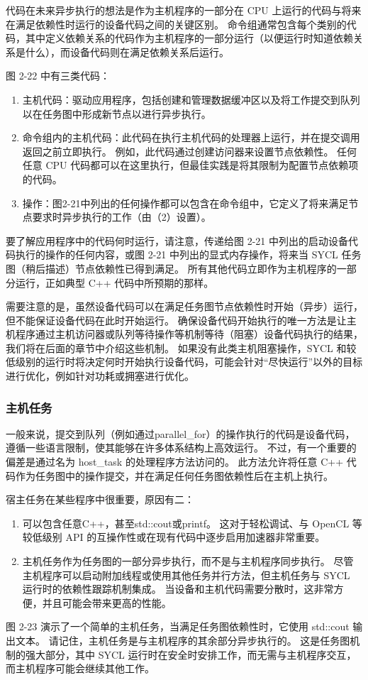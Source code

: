 代码在未来异步执行的想法是作为主机程序的一部分在 CPU 上运行的代码与将来在满足依赖性时运行的设备代码之间的关键区别。 命令组通常包含每个类别的代码，其中定义依赖关系的代码作为主机程序的一部分运行（以便运行时知道依赖关系是什么），而设备代码则在满足依赖关系后运行。

图 2-22 中有三类代码：

\begin{enumerate}
	\item 主机代码：驱动应用程序，包括创建和管理数据缓冲区以及将工作提交到队列以在任务图中形成新节点以进行异步执行。

	\item 命令组内的主机代码：此代码在执行主机代码的处理器上运行，并在提交调用返回之前立即执行。 例如，此代码通过创建访问器来设置节点依赖性。 任何任意 CPU 代码都可以在这里执行，但最佳实践是将其限制为配置节点依赖项的代码。

	\item 操作：图2-21中列出的任何操作都可以包含在命令组中，它定义了将来满足节点要求时异步执行的工作（由（2）设置）。
\end{enumerate}

要了解应用程序中的代码何时运行，请注意，传递给图 2-21 中列出的启动设备代码执行的操作的任何内容，或图 2-21 中列出的显式内存操作，将来当 SYCL 任务图（稍后描述）节点依赖性已得到满足。 所有其他代码立即作为主机程序的一部分运行，正如典型 C++ 代码中所预期的那样。

需要注意的是，虽然设备代码可以在满足任务图节点依赖性时开始（异步）运行，但不能保证设备代码在此时开始运行。 确保设备代码开始执行的唯一方法是让主机程序通过主机访问器或队列等待操作等机制等待（阻塞）设备代码执行的结果，我们将在后面的章节中介绍这些机制。 如果没有此类主机阻塞操作，SYCL 和较低级别的运行时将决定何时开始执行设备代码，可能会针对“尽快运行”以外的目标进行优化，例如针对功耗或拥塞进行优化。

\subsubsection{主机任务}
一般来说，提交到队列（例如通过parallel\_for）的操作执行的代码是设备代码，遵循一些语言限制，使其能够在许多体系结构上高效运行。 不过，有一个重要的偏差是通过名为 host\_task 的处理程序方法访问的。 此方法允许将任意 C++ 代码作为任务图中的操作提交，并在满足任何任务图依赖性后在主机上执行。

宿主任务在某些程序中很重要，原因有二：
\begin{enumerate}
	\item 可以包含任意C++，甚至std::cout或printf。 这对于轻松调试、与 OpenCL 等较低级别 API 的互操作性或在现有代码中逐步启用加速器非常重要。

	\item 主机任务作为任务图的一部分异步执行，而不是与主机程序同步执行。 尽管主机程序可以启动附加线程或使用其他任务并行方法，但主机任务与 SYCL 运行时的依赖性跟踪机制集成。 当设备和主机代码需要分散时，这非常方便，并且可能会带来更高的性能。
\end{enumerate}
图 2-23 演示了一个简单的主机任务，当满足任务图依赖性时，它使用 std::cout 输出文本。 请记住，主机任务是与主机程序的其余部分异步执行的。 这是任务图机制的强大部分，其中 SYCL 运行时在安全时安排工作，而无需与主机程序交互，而主机程序可能会继续其他工作。

